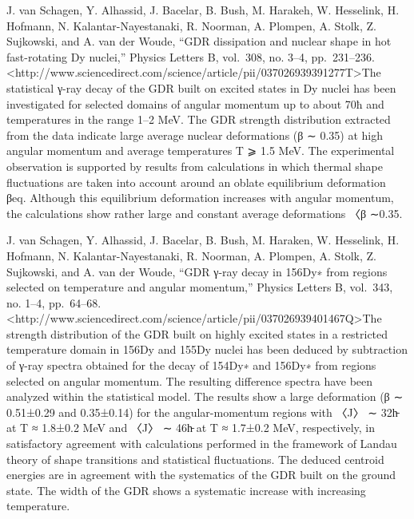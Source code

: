 \documentclass[]{article}
\begin{document}
J. van Schagen, Y. Alhassid, J. Bacelar, B. Bush, M. Harakeh, W.
Hesselink, H. Hofmann, N. Kalantar-Nayestanaki, R. Noorman, A. Plompen,
A. Stolk, Z. Sujkowski, and A. van der Woude, ``GDR dissipation and
nuclear shape in hot fast-rotating Dy nuclei,'' Physics Letters B,
vol.~308, no. 3--4, pp.~231--236.
\textless{}http://www.sciencedirect.com/science/article/pii/037026939391277T\textgreater{}The
statistical γ-ray decay of the GDR built on excited states in Dy nuclei
has been investigated for selected domains of angular momentum up to
about 70ħ and temperatures in the range 1--2 MeV. The GDR strength
distribution extracted from the data indicate large average nuclear
deformations (β ∼ 0.35) at high angular momentum and average
temperatures T ⩾ 1.5 MeV. The experimental observation is supported by
results from calculations in which thermal shape fluctuations are taken
into account around an oblate equilibrium deformation βeq. Although this
equilibrium deformation increases with angular momentum, the
calculations show rather large and constant average deformations 〈β
∼0.35.

J. van Schagen, Y. Alhassid, J. Bacelar, B. Bush, M. Haraken, W.
Hesselink, H. Hofmann, N. Kalantar-Nayestanaki, R. Noorman, A. Plompen,
A. Stolk, Z. Sujkowski, and A. van der Woude, ``GDR γ-ray decay in
156Dy∗ from regions selected on temperature and angular momentum,''
Physics Letters B, vol.~343, no. 1--4, pp.~64--68.
\textless{}http://www.sciencedirect.com/science/article/pii/037026939401467Q\textgreater{}The
strength distribution of the GDR built on highly excited states in a
restricted temperature domain in 156Dy and 155Dy nuclei has been deduced
by subtraction of γ-ray spectra obtained for the decay of 154Dy∗ and
156Dy∗ from regions selected on angular momentum. The resulting
difference spectra have been analyzed within the statistical model. The
results show a large deformation (\textbar{}β\textbar{} ∼ 0.51±0.29 and
0.35±0.14) for the angular-momentum regions with 〈J〉 ∼ 32h̵ at T ≈
1.8±0.2 MeV and 〈J〉 ∼ 46h̵ at T ≈ 1.7±0.2 MeV, respectively, in
satisfactory agreement with calculations performed in the framework of
Landau theory of shape transitions and statistical fluctuations. The
deduced centroid energies are in agreement with the systematics of the
GDR built on the ground state. The width of the GDR shows a systematic
increase with increasing temperature.
\end{document}
